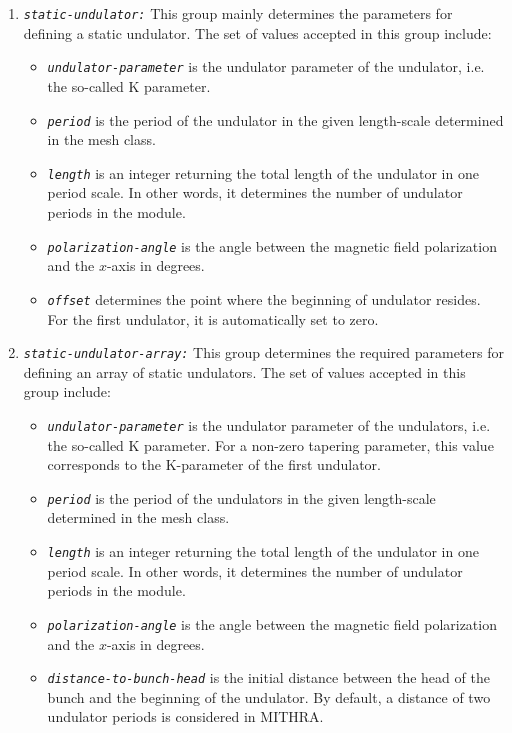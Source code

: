 \begin{enumerate}
%
\item {\tt \small \em static-undulator:} This group mainly determines the parameters for defining a static undulator. The set of values accepted in this group include:
%
\begin{itemize}
	\item {\tt \small \em undulator-parameter} is the undulator parameter of the undulator, i.e. the so-called K parameter.
	\item {\tt \small \em period} is the period of the undulator in the given length-scale determined in the mesh class.
	\item {\tt \small \em length} is an integer returning the total length of the undulator in one period scale. In other words, it determines the number of undulator periods in the module.
    \item {\tt \small \em polarization-angle} is the angle between the magnetic field polarization and the $x$-axis in degrees.
    \item {\tt \small \em offset} determines the point where the beginning of undulator resides. For the first undulator, it is automatically set to zero.
\end{itemize}
%
\item {\tt \small \em static-undulator-array:} This group determines the required parameters for defining an array of static undulators. The set of values accepted in this group include:
%
\begin{itemize}
	\item {\tt \small \em undulator-parameter} is the undulator parameter of the undulators, i.e. the so-called K parameter. For a non-zero tapering parameter, this value corresponds to the K-parameter of the first undulator.
	\item {\tt \small \em period} is the period of the undulators in the given length-scale determined in the mesh class.
	\item {\tt \small \em length} is an integer returning the total length of the undulator in one period scale. In other words, it determines the number of undulator periods in the module.
	\item {\tt \small \em polarization-angle} is the angle between the magnetic field polarization and the $x$-axis in degrees.
	\item {\tt \small \em distance-to-bunch-head} is the initial distance between the head of the bunch and the beginning of the undulator. By default, a distance of two undulator periods is considered in MITHRA.

\end{itemize}
\end{enumerate}
